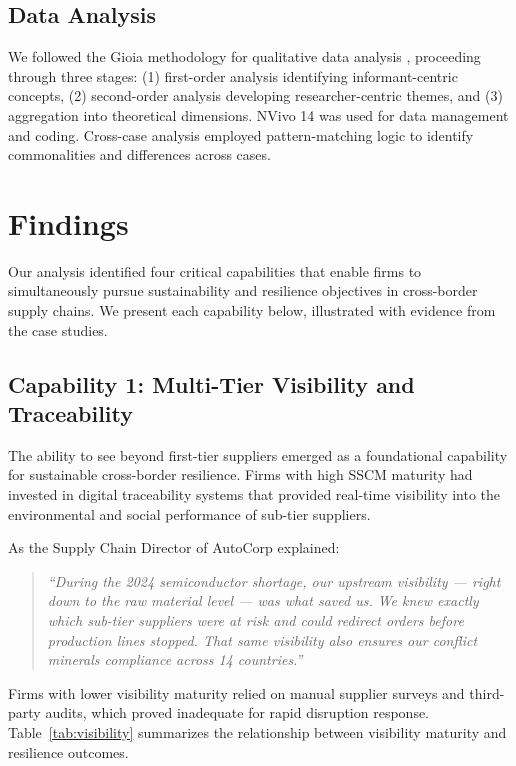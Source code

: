 \documentclass[12pt,a4paper,twoside]{article}
\begin{document}
\subsection{Data Analysis}

We followed the Gioia methodology for qualitative data analysis
\citep{gioia2013seeking}, proceeding through three stages: (1) first-order
analysis identifying informant-centric concepts, (2) second-order analysis
developing researcher-centric themes, and (3) aggregation into theoretical
dimensions.  NVivo 14 was used for data management and coding.  Cross-case
analysis employed pattern-matching logic \citep{yin2018case} to identify
commonalities and differences across cases.

\section{Findings}
\label{sec:findings}

Our analysis identified four critical capabilities that enable firms to
simultaneously pursue sustainability and resilience objectives in cross-border
supply chains.  We present each capability below, illustrated with evidence
from the case studies.

\subsection{Capability 1: Multi-Tier Visibility and Traceability}

The ability to see beyond first-tier suppliers emerged as a foundational
capability for sustainable cross-border resilience.  Firms with high SSCM
maturity had invested in digital traceability systems that provided real-time
visibility into the environmental and social performance of sub-tier suppliers.

As the Supply Chain Director of AutoCorp explained:

\begin{quote}
\itshape
``During the 2024 semiconductor shortage, our upstream visibility --- right down
to the raw material level --- was what saved us.  We knew exactly which
sub-tier suppliers were at risk and could redirect orders before production
lines stopped.  That same visibility also ensures our conflict minerals
compliance across 14 countries.''
\end{quote}

Firms with lower visibility maturity relied on manual supplier surveys and
third-party audits, which proved inadequate for rapid disruption response.
Table~\ref{tab:visibility} summarizes the relationship between visibility
maturity and resilience outcomes.
\end{document}
